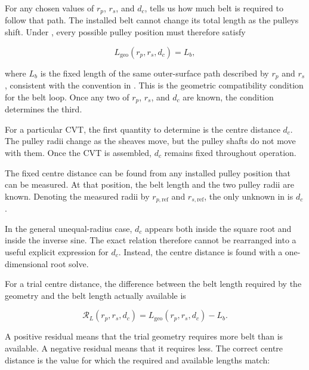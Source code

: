 \documentclass[11pt]{report}
\numberwithin{equation}{section}
\newcounter{assump}
\begin{document}
For any chosen values of \(r_p\), \(r_s\), and \(d_c\),
 tells us how much belt is required to follow that
path. The installed belt cannot change its total length as the pulleys shift.
Under , every possible pulley position must
therefore satisfy

\begin{equation}
    L_{\mathrm{geo}}(r_p,r_s,d_c)=L_b,
    \label{eq:belt_length_compatibility}
\end{equation}

where \(L_b\) is the fixed length of the same outer-surface path described by
\(r_p\) and \(r_s\), consistent with the convention in
. This is the geometric compatibility
condition for the belt loop. Once any two of \(r_p\), \(r_s\), and \(d_c\) are
known, the condition determines the third.

For a particular CVT, the first quantity to determine is the centre distance
\(d_c\). The pulley radii change as the sheaves move, but the pulley shafts do
not move with them. Once the CVT is assembled, \(d_c\) remains fixed throughout
operation.

The fixed centre distance can be found from any installed pulley position
that can be measured. At that position, the belt length and the two pulley
radii are known. Denoting the measured radii by
\(r_{p,\mathrm{ref}}\) and \(r_{s,\mathrm{ref}}\), the only unknown in
 is \(d_c\).

In the general unequal-radius case, \(d_c\) appears both inside the square root
and inside the inverse sine. The exact relation therefore cannot be
rearranged into a useful explicit expression for \(d_c\). Instead, the centre
distance is found with a one-dimensional root solve.

For a trial centre distance, the difference between the belt length required
by the geometry and the belt length actually available is

\begin{equation}
    \mathcal{R}_L(r_p,r_s,d_c)
    =
    L_{\mathrm{geo}}(r_p,r_s,d_c)-L_b.
    \label{eq:belt_length_residual}
\end{equation}

A positive residual means that the trial geometry requires more belt than is
available. A negative residual means that it requires less. The correct
centre distance is the value for which the required and available lengths
match:
\end{document}
